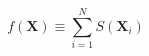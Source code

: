 \documentclass[border=2pt,varwidth]{standalone}
\begin{document}
\[
  f(\mathbf{X}) \equiv \sum_{i=1}^N S(\mathbf{X}_i)
\]
\end{document}
